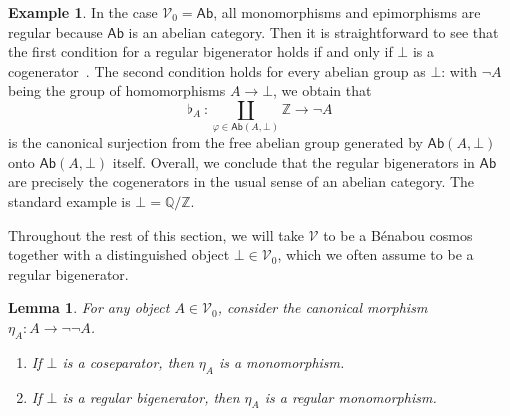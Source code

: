 \documentclass[11pt,onecolumn]{article}
\newcommand{\Z}{\mathbb{Z}}
\newcommand{\Q}{\mathbb{Q}}
\newcommand{\cV}{\mathscr{V}}
\newcommand{\Ab}{\mathsf{Ab}}
\theoremstyle{plain}
\newtheorem{lem}[lem]{Lemma}
\theoremstyle{remark}
\theoremstyle{definition}
\newtheorem{example}[example]{Example}
\begin{document}
\begin{example}
	\label{ab_cogen}
	In the case $\cV_0 = \Ab$, all monomorphisms and epimorphisms are regular because $\Ab$ is an abelian category.
	Then it is straightforward to see that the first condition for a regular bigenerator holds if and only if $\bot$ is a cogenerator~\cite[Section~3.3]{FreydAbelian}.
	The second condition holds for every abelian group as $\bot$: with $\neg A$ being the group of homomorphisms $A \to \bot$, we obtain that
	\[
		\flat_A \: \colon \coprod_{\varphi \in \Ab(A,\bot)} \Z \longrightarrow \neg A
	\]
	is the canonical surjection from the free abelian group generated by $\Ab(A,\bot)$ onto $\Ab(A,\bot)$ itself.
	Overall, we conclude that the regular bigenerators in $\Ab$ are precisely the cogenerators in the usual sense of an abelian category.
	The standard example is $\bot = \Q / \Z$.
\end{example}

Throughout the rest of this section, we will take $\cV$ to be a B\'enabou cosmos together with a distinguished object $\bot \in \cV_0$, which we often assume to be a regular bigenerator.

\begin{lem}
	\label{lem:neg_monos}
	For any object $A \in \cV_0$, consider the canonical morphism $\eta_A \colon A \to \neg\neg A$.
	\begin{enumerate}
		\item If $\bot$ is a coseparator, then $\eta_A$ is a monomorphism.
		\item If $\bot$ is a regular bigenerator, then $\eta_A$ is a regular monomorphism.
	\end{enumerate}
\end{lem}
\end{document}
